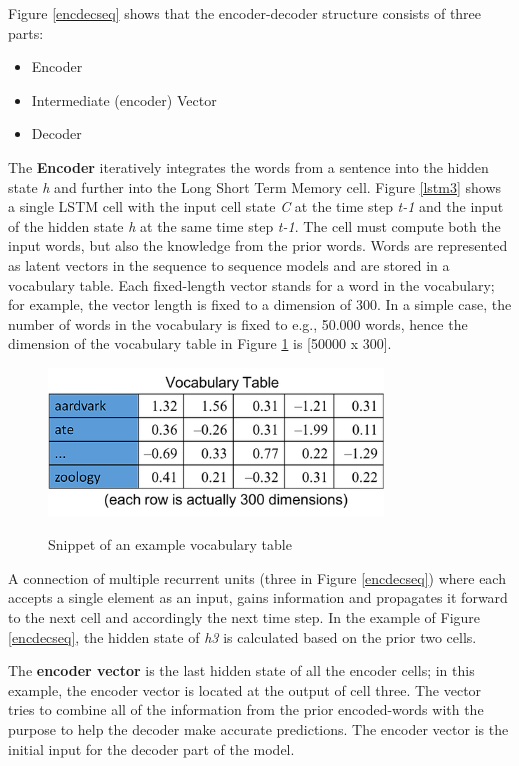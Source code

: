 Figure \ref{encdecseq} shows that the encoder-decoder structure consists of three parts:

\begin{itemize}
	\item Encoder
	\item Intermediate (encoder) Vector
	\item Decoder
\end{itemize}


The \textbf{Encoder} iteratively integrates the words from a sentence into the hidden state \textit{h} and further into the Long Short Term Memory cell.
Figure \ref{lstm3} shows a single LSTM cell with the input cell state \textit{C} at the time step \textit{t-1} and the input of the hidden state \textit{h} at the same time step \textit{t-1}. The cell must compute both the input words, but also the knowledge from the prior words. Words are represented as latent vectors in the sequence to sequence models and are stored in a vocabulary table. Each fixed-length vector stands for a word in the vocabulary; for example, the vector length is fixed to a dimension of 300. In a simple case, the number of words in the vocabulary is fixed to e.g., 50.000 words, hence the dimension of the vocabulary table in Figure \ref{voctable} is [50000 x 300]. 

\begin{figure}
	\begin{center}
		\includegraphics[width=3.5in]{photos/w1-16}\\
		\caption{Snippet of an example vocabulary table \cite{mugan}}\label{voctable}
	\end{center}
\end{figure}

A connection of multiple recurrent units (three in Figure \ref{encdecseq}) where each accepts a single element as an input, gains information and propagates it forward to the next cell and accordingly the next time step. In the example of Figure \ref{encdecseq}, the hidden state of \textit{h3} is calculated based on the prior two cells.


The \textbf{encoder vector} is the last hidden state of all the encoder cells; in this example, the encoder vector is located at the output of cell three. The vector tries to combine all of the information from the prior encoded-words with the purpose to help the decoder make accurate predictions. The encoder vector is the initial input for the decoder part of the model.

